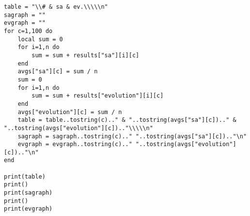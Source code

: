 \begin{appendices}
\begin{lstlisting}
table = "\\# & sa & ev.\\\\\n"
sagraph = ""
evgraph = ""
for c=1,100 do
    local sum = 0
    for i=1,n do
        sum = sum + results["sa"][i][c]
    end
    avgs["sa"][c] = sum / n
    sum = 0
    for i=1,n do
        sum = sum + results["evolution"][i][c]
    end
    avgs["evolution"][c] = sum / n
    table = table..tostring(c).." & "..tostring(avgs["sa"][c]).." & "..tostring(avgs["evolution"][c]).."\\\\\n"
    sagraph = sagraph..tostring(c).." "..tostring(avgs["sa"][c]).."\n"
    evgraph = evgraph..tostring(c).." "..tostring(avgs["evolution"][c]).."\n"
end

print(table)
print()
print(sagraph)
print()
print(evgraph)
\end{lstlisting}


\end{appendices}
